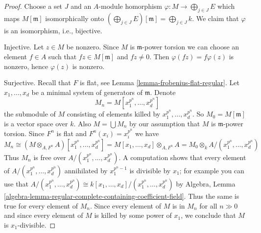 \begin{proof}
Choose a set $J$ and an $A$-module homorphism
$\varphi : M \to \bigoplus_{j \in J} E$ which maps
$M[\mathfrak m]$ isomorphically onto
$(\bigoplus_{j \in J} E)[\mathfrak m] = \bigoplus_{j \in J} k$.
We claim that $\varphi$ is an isomorphism, i.e., bijective.

\medskip\noindent
Injective. Let $z \in M$ be nonzero. Since $M$ is $\mathfrak m$-power torsion
we can choose an element $f \in A$ such that $fz \in M[\mathfrak m]$ and
$fz \not = 0$. Then $\varphi(fz) = f\varphi(z)$ is nonzero, hence
$\varphi(z)$ is nonzero.

\medskip\noindent
Surjective. Recall that $F$ is flat, see
Lemma \ref{lemma-frobenius-flat-regular}.
Let $x_1, \ldots, x_d$ be a minimal system of generators of
$\mathfrak m$. Denote
$$
M_n = M[x_1^{p^n}, \ldots, x_d^{p^n}]
$$
the submodule of $M$ consisting of elements killed by
$x_1^{p^n}, \ldots, x_d^{p^n}$. So $M_0 = M[\mathfrak m]$
is a vector space over $k$. Also $M = \bigcup M_n$ by our
assumption that $M$ is $\mathfrak m$-power torsion. Since $F^n$ is flat and
$F^n(x_i) = x_i^{p^n}$ we have
$$
M_n \cong (M \otimes_{A, F^n} A)[x_1^{p^n}, \ldots, x_d^{p^n}] =
M[x_1, \ldots, x_d] \otimes_{A, F^n} A =
M_0 \otimes_k A/(x_1^{p^n}, \ldots, x_d^{p^n})
$$
Thus $M_n$ is free over $A/(x_1^{p^n}, \ldots, x_d^{p^n})$.
A computation shows that every element of $A/(x_1^{p^n}, \ldots, x_d^{p^n})$
annihilated by $x_1^{p^n - 1}$ is divisible by $x_1$; for example
you can use that $A/(x_1^{p^n}, \ldots, x_d^{p^n}) \cong
k[x_1, \ldots, x_d]/(x_1^{p^n}, \ldots, x_d^{p^n})$ by Algebra, Lemma
\ref{algebra-lemma-regular-complete-containing-coefficient-field}.
Thus the same is true for every element of $M_n$.
Since every element of $M$ is in $M_n$ for all $n \gg 0$
and since every element of $M$ is killed by some power of
$x_1$, we conclude that $M$ is $x_1$-divisible.


\end{proof}
